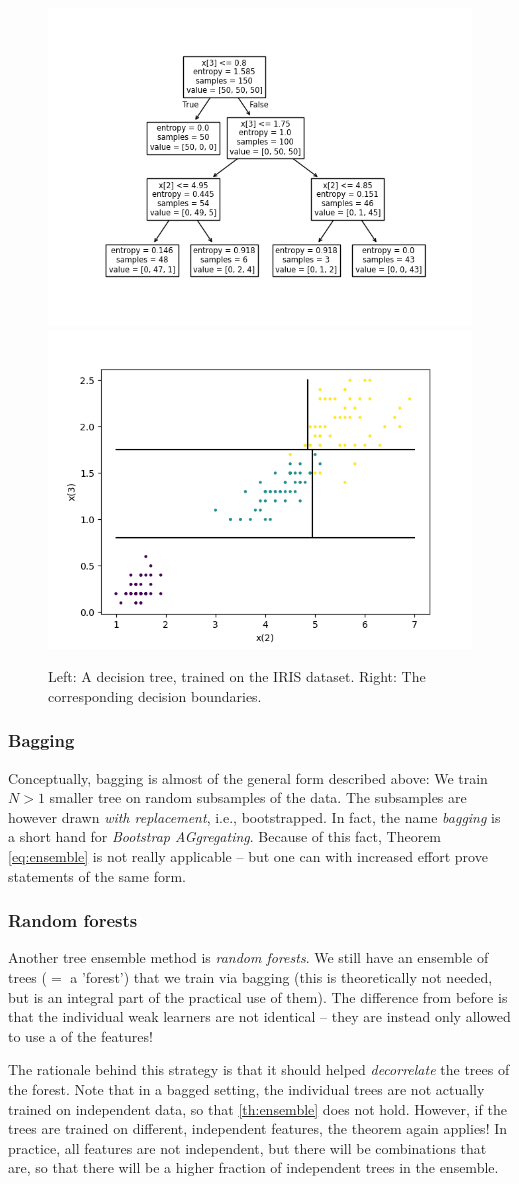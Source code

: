 \documentclass{article}
\begin{document}
\begin{figure}
    \centering
    \includegraphics[width=0.35\linewidth]{graphics/trained_tree.png}\includegraphics[width=0.35\linewidth]{graphics/decision_surfaces.png}
    \caption{Left: A decision tree, trained on the IRIS dataset. Right: The corresponding decision boundaries.}
    \label{fig:enter-label}
\end{figure}


\subsubsection{Bagging}
Conceptually, bagging is almost of the general form described above: We train $N>1$ smaller tree on random  subsamples of the data. The subsamples are however drawn \emph{with replacement}, i.e., bootstrapped. In fact, the name \emph{bagging} is a short hand for \emph{Bootstrap AGgregating}. Because of this fact, Theorem \ref{eq:ensemble} is not really applicable -- but one can with increased effort prove statements of the same form.


\subsubsection{Random forests} Another tree ensemble method is \emph{random forests}. We still have an ensemble of trees ($=$ a 'forest') that we train via bagging (this is theoretically not needed, but is an integral part of the practical use of them). The difference from before is that the individual weak learners are not identical -- they are instead only allowed to use a  of the features!

The rationale behind this strategy is that it should helped \emph{decorrelate} the trees of the forest. Note that in a bagged setting, the individual trees are not actually trained on independent data, so that \eqref{th:ensemble} does not hold. However, if the trees are trained on different, independent features, the theorem again applies! In practice, all features are not independent, but there will be combinations that are, so that there will be a higher fraction of independent trees in the ensemble. 
\end{document}
